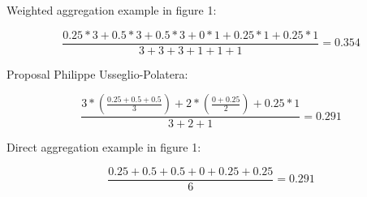 \documentclass{article}
\begin{document}
Weighted aggregation example in figure 1: 

\begin{equation*}
  \frac{0.25*3+0.5*3+0.5*3+0*1+0.25*1+0.25*1}{3+3+3+1+1+1} = 0.354 
\end{equation*}

Proposal Philippe Usseglio-Polatera: 

\begin{equation*}
  \frac{3* (\frac{0.25+0.5+0.5}{3})+ 2* (\frac{0+0.25}{2})+0.25*1}{3+2+1} = 0.291
\end{equation*}

Direct aggregation example in figure 1:

\begin{equation*}
  \frac{0.25+0.5+0.5+0+0.25+0.25}{6} = 0.291
\end{equation*}
\end{document}
